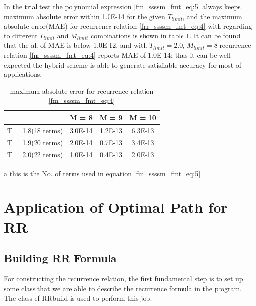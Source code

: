 In the trial test the polynomial expression \ref{fm_ssssm_fmt_eq:5} 
always keeps maximum absolute error within 1.0E-14 for the given $T_{limit}$, and the 
maximum absolute error(MAE) for recurrence relation \ref{fm_ssssm_fmt_eq:4} with regarding to 
different $T_{limit}$ and $M_{limit}$ combinations is shown in table \ref{table:1}. 
It can be found that the all of MAE is below 1.0E-12, and 
with $T_{limit}=2.0$, $M_{limit}=8$ recurrence relation \ref{fm_ssssm_fmt_eq:4} reports
MAE of 1.0E-14; thus it can be well expected the hybrid scheme is able to generate satisfiable
accuracy for most of applications.

\begin{table}
\caption{maximum absolute error for recurrence relation \ref{fm_ssssm_fmt_eq:4}}
\label{table:1}
\begin{center}
\begin{threeparttable}
\begin{tabular}{c|c|c|c}
\hline
                    &       M = 8         &      M = 9        &   M = 10          \\
\hline
T = 1.8(18 terms)\tnote{a}   
                    &       3.0E-14       &      1.2E-13      &   6.3E-13         \\
\hline
T = 1.9(20 terms)   &       2.0E-14       &      0.7E-13      &   3.4E-13         \\
\hline
T = 2.0(22 terms)   &       1.0E-14       &      0.4E-13      &   2.0E-13         \\
\hline
\end{tabular}
\begin{tablenotes}
    \item[a] this is the No. of terms used in equation \ref{fm_ssssm_fmt_eq:5}
\end{tablenotes}
\end{threeparttable}
\end{center}
\end{table} 




\section{Application of Optimal Path for RR}

\subsection{Building RR Formula}
\label{rrbuild}
%
%
For constructing the recurrence relation, the first fundamental step is to set up some class
that we are able to describe the recurrence formula in the program. The class of RRbuild
is used to perform this job.

